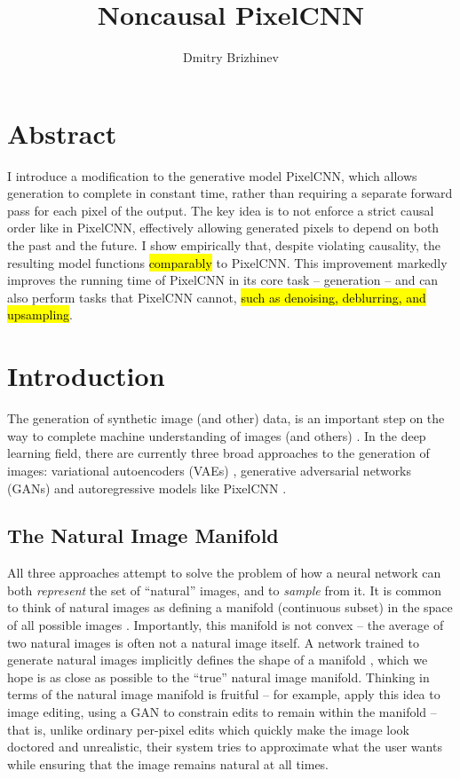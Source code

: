 \documentclass[10pt,a4paper]{article}
\newcommand{\nquote}[1]{``{#1}''}
\begin{document}
\title{\vspace{-10ex}Noncausal PixelCNN}
\author{Dmitry Brizhinev}
\maketitle

\section*{Abstract}
I introduce a modification to the generative model PixelCNN, which allows generation to complete in constant time, rather than requiring a separate forward pass for each pixel of the output. The key idea is to not enforce a strict causal order like in PixelCNN, effectively allowing generated pixels to depend on both the past and the future. I show empirically that, despite violating causality, the resulting model functions \hl{comparably} to PixelCNN. This improvement markedly improves the running time of PixelCNN in its core task -- generation -- and can also perform tasks that PixelCNN cannot, \hl{such as denoising, deblurring, and upsampling}.

\tableofcontents

\section{Introduction}

The generation of synthetic image (and other) data, is an important step on the way to complete machine understanding of images (and others) \cite{??}. In the deep learning field, there are currently three broad approaches to the generation of images: variational autoencoders (VAEs) \cite{vae}, generative adversarial networks (GANs) \cite{gan} and autoregressive models like PixelCNN \cite{pixelcnn2}.

\subsection{The Natural Image Manifold}

All three approaches attempt to solve the problem of how a neural network can both \emph{represent} the set of \nquote{natural} images, and to \emph{sample} from it. It is common to think of natural images as defining a manifold (continuous subset) in the space of all possible images \cite{manifoldmanipulation,imageinpainting,manifoldmixup}. Importantly, this manifold is not convex -- the average of two natural images is often not a natural image itself. A network trained to generate natural images implicitly defines the shape of a manifold \cite{manifoldmanipulation}, which we hope is as close as possible to the \nquote{true} natural image manifold. Thinking in terms of the natural image manifold is fruitful -- for example, \cite{manifoldmanipulation} apply this idea to image editing, using a GAN to constrain edits to remain within the manifold -- that is, unlike ordinary per-pixel edits which quickly make the image look doctored and unrealistic, their system tries to approximate what the user wants while ensuring that the image remains natural at all times.
\end{document}
